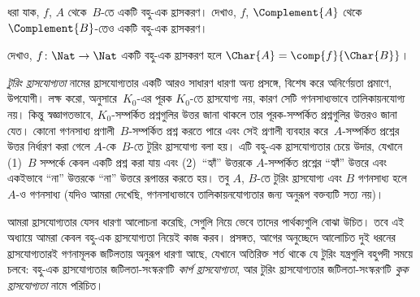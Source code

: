 \documentclass[../../../include/open-logic-section]{subfiles}
\begin{document}
\begin{prob}
ধরা যাক, $f$, $A$ থেকে~$B$-তে একটি বহু-এক হ্রাসকরণ। দেখাও, $f$,
$\Complement{A}$ থেকে~$\Complement{B}$-তেও একটি বহু-এক হ্রাসকরণ।
\end{prob}

\begin{prob}
দেখাও, $f\colon \Nat \to \Nat$ একটি বহু-এক হ্রাসকরণ হলে
$\Char{A} = \comp{f}{\Char{B}}$।
\end{prob}

\begin{digress}
\emph{টুরিং হ্রাসযোগ্যতা} নামের হ্রাসযোগ্যতার একটি আরও সাধারণ ধারণা অন্য
প্রসঙ্গে, বিশেষ করে অনির্ণেয়তা প্রমাণে, উপযোগী। লক্ষ করো,
 অনুসারে~$K_0$-এর পূরক $K_0$-তে হ্রাসযোগ্য নয়,
কারণ সেটি গণনসাধ্যভাবে তালিকায়নযোগ্য নয়। কিন্তু স্বজ্ঞাগতভাবে,
$K_0$-সম্পর্কিত প্রশ্নগুলির উত্তর জানা থাকলে তার পূরক-সম্পর্কিত
প্রশ্নগুলির উত্তরও জানা যেত। কোনো গণনসাধ্য প্রণালী~$B$-সম্পর্কিত প্রশ্ন
করতে পারে এবং সেই প্রণালী ব্যবহার করে~$A$-সম্পর্কিত প্রশ্নের উত্তর
নির্ধারণ করা গেলে $A$-কে~$B$-তে টুরিং হ্রাসযোগ্য বলা হয়। এটি বহু-এক
হ্রাসযোগ্যতার চেয়ে উদার, যেখানে (1)~$B$ সম্পর্কে কেবল একটি প্রশ্ন করা
যায় এবং (2)~“হ্যাঁ” উত্তরকে $A$-সম্পর্কিত প্রশ্নের “হ্যাঁ” উত্তরে এবং
একইভাবে “না” উত্তরকে “না” উত্তরে রূপান্তর করতে হয়। তবু $A$, $B$-তে
টুরিং হ্রাসযোগ্য এবং $B$ গণনসাধ্য হলে $A$-ও গণনসাধ্য (যদিও আমরা দেখেছি,
গণনসাধ্যভাবে তালিকায়নযোগ্যতার জন্য অনুরূপ বক্তব্যটি সত্য নয়)।

আমরা হ্রাসযোগ্যতার যেসব ধারণা আলোচনা করেছি, সেগুলি নিয়ে ভেবে তাদের
পার্থক্যগুলি বোঝা উচিত। তবে এই অধ্যায়ে আমরা কেবল বহু-এক হ্রাসযোগ্যতা
নিয়েই কাজ করব। প্রসঙ্গত, আগের অনুচ্ছেদে আলোচিত দুই ধরনের হ্রাসযোগ্যতারই
গণনামূলক জটিলতায় অনুরূপ ধারণা আছে, যেখানে অতিরিক্ত শর্ত থাকে যে টুরিং
যন্ত্রগুলি বহুপদী সময়ে চলবে: বহু-এক হ্রাসযোগ্যতার জটিলতা-সংস্করণটি
\emph{কার্প হ্রাসযোগ্যতা}, আর টুরিং হ্রাসযোগ্যতার জটিলতা-সংস্করণটি
\emph{কুক হ্রাসযোগ্যতা} নামে পরিচিত।
\end{digress}
\end{document}

